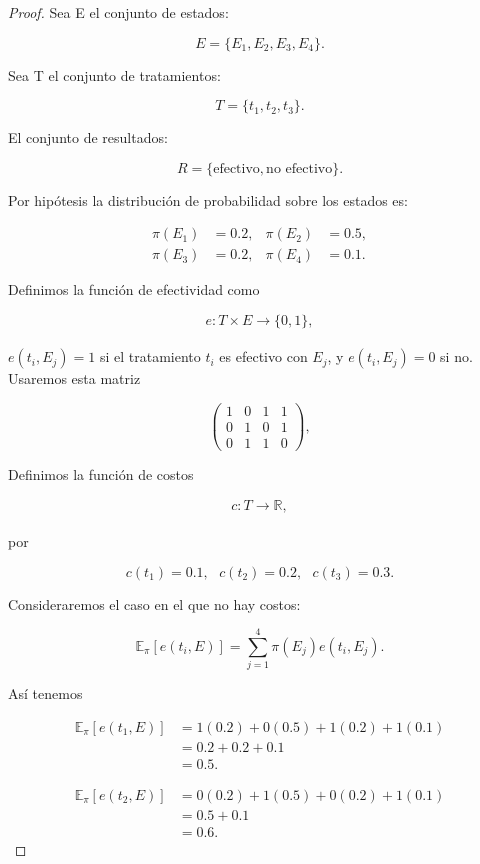 \documentclass[11pt,letterpaper]{article}
\begin{document}
\begin{proof}

    Sea E el conjunto de estados:

    \[
    E=\{E_1,E_2,E_3,E_4\}.
    \]

    Sea T el conjunto de tratamientos:

    \[
    T=\{t_1,t_2,t_3\}.
    \]

    El conjunto de resultados:

    \[
    R=\{\text{efectivo},\text{no efectivo}\}.
    \]

    Por hipótesis la distribución de probabilidad sobre los estados es:

    \[
    \begin{aligned}
    \pi(E_1)&=0.2, & \pi(E_2)&=0.5,\\ \pi(E_3)&=0.2, & \pi(E_4)&=0.1.
    \end{aligned}
    \]

    Definimos la función de efectividad como

    \[
    e:T\times E\xrightarrow[]{}\{0,1\},
    \]

    $e(t_i,E_j)=1$ si el tratamiento $t_i$ es efectivo con $E_j$, y $e(t_i,E_j)=0$ si no. Usaremos esta matriz
    
    \[
    \begin{pmatrix}
    1&0&1&1\\
    0&1&0&1\\
    0&1&1&0
    \end{pmatrix},
    \]

    Definimos la función de costos

    \[
    c:T\xrightarrow[]{}\mathbb{R},
    \]

    por

    \[
    c(t_1)=0.1,\ \ \ c(t_2)=0.2,\ \ \ c(t_3)=0.3.
    \]

    Consideraremos el caso en el que no hay costos:

    \[
    \mathbb{E}_\pi[e(t_i,E)]=\sum_{j=1}^{4}\pi(E_j)e(t_i,E_j).
    \]

    Así tenemos

    \[
    \begin{aligned}
    \mathbb{E}_\pi[e(t_1,E)] &=1(0.2)+0(0.5)+1(0.2)+1(0.1)\\ &=0.2+0.2+0.1\\ &=0.5.
    \end{aligned}
    \]

    \[
    \begin{aligned}
    \mathbb{E}_\pi[e(t_2,E)] &=0(0.2)+1(0.5)+0(0.2)+1(0.1)\\ &=0.5+0.1\\ &=0.6.
    \end{aligned}
    \]
    

\end{proof}
\end{document}
